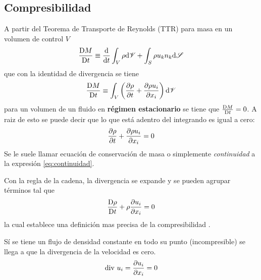 \subsection{Compresibilidad}
A partir del Teorema de Transporte de Reynolds (TTR) para masa en un volumen de control $V$
$$\frac{\textrm{D} M}{\textrm{D} t}\equiv\frac{\textrm{d} }{\textrm{d} t}\int_V \rho\textrm{d} \mathscr{V} +\int_S \rho u_k n_k \textrm{d} \mathscr{S} $$
que con la identidad de divergencia se tiene
$$\frac{\textrm{D} M}{\textrm{D} t} \equiv \int_V \left( \frac{\partial \rho}{\partial t}+\frac{\partial \rho u_i}{\partial x_i} \right) \textrm{d} \mathscr{V} $$
para un volumen de un fluido en \textbf{régimen estacionario} se tiene que $\frac{\textrm{D} M}{\textrm{D} t}=0$. A raiz de esto se puede decir que lo que está adentro del integrando es igual a cero:
\begin{equation} \label{eq:continuidad}
    \frac{\partial \rho}{\partial t} +\frac{\partial \rho u_i}{\partial x_i}=0
\end{equation}
Se le suele llamar ecuación de conservación de masa o simplemente \emph{continuidad} a la expresión \ref{eq:continuidad}.\par

Con la regla de la cadena, la divergencia se expande y se pueden agrupar términos tal que
\begin{equation} \label{eq:compresibilidad}
\frac{\textrm{D} \rho}{\textrm{D} t}+\rho \frac{\partial u_i}{\partial x_i} =0
\end{equation}
la cual establece una definición mas precisa de la compresibilidad \citep{vieytes2018filminas}.

Sí se tiene un flujo de densidad constante en todo su punto (incompresible) se llega a que la divergencia de la velocidad es cero.
\begin{equation} \label{eq:incompresible}
    \textrm{div } u_i =\frac{\partial u_i}{\partial x_i}=0
\end{equation}


